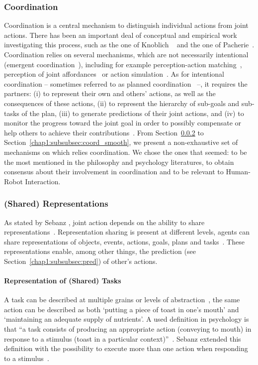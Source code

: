 \documentclass[a4paper,11pt,twoside]{StyleThese}
\begin{document}
\subsubsection{Coordination}
Coordination is a central mechanism to distinguish individual actions from joint actions. There has been an important deal of conceptual and empirical work investigating this process, such as the one of Knoblich \etal~\cite{knoblich_2011_joint} and the one of Pacherie~\cite{pacherie_2012_agency}. Coordination relies on several mechanisms, which are not necessarily intentional (emergent coordination~\cite{knoblich_2011_joint}), including for example perception-action matching~\cite{brass_2001_movement}, perception of joint affordances~\cite{ramenzoni_2008_short} or action simulation~\cite{sebanz_2009_prediction}. As for intentional coordination – sometimes referred to as planned coordination~\cite{knoblich_2011_joint} –, it requires the partners: (i) to represent their own and others' actions, as well as the consequences of these actions, (ii) to represent the hierarchy of sub-goals and sub-tasks of the plan, (iii) to generate predictions of their joint actions, and (iv) to monitor the progress toward the joint goal in order to possibly compensate or help others to achieve their contributions~\cite{pacherie_2012_agency}. From Section~\ref{chap1:subsubsec:shared_rep} to Section~\ref{chap1:subsubsec:coord_smooth}, we present a non-exhaustive set of mechanisms on which relies coordination. We chose the ones that seemed: to be the most mentioned in the philosophy and psychology literatures, to obtain consensus about their involvement in coordination and to be relevant to Human-Robot Interaction. 

\subsubsection{(Shared) Representations}\label{chap1:subsubsec:shared_rep}
As stated by Sebanz \etal, joint action depends on the ability to share representations~\cite{sebanz_2006_joint}. Representation sharing is present at different levels, \ie agents can share representations of objects, events, actions, goals, plans and tasks~\cite{pacherie_2012_agency,vesper_2017_joint}. These representations enable, among other things, the prediction (see Section~\ref{chap1:subsubsec:pred}) of other's actions. 

\paragraph{Representation of (Shared) Tasks}
A task can be described at multiple grains or levels of abstraction~\cite{cooper_2000_contention},  the same action can be described
as both ‘putting a piece of toast in one’s mouth’ and ‘maintaining an adequate supply of nutrients’. A used definition in psychology is that ``a task consists of producing an appropriate action (\eg conveying to mouth) in response to a stimulus (\eg toast in a particular context)''~\cite[p.~1]{monsell_2003_task}. Sebanz \etal{} extended this definition with the possibility to execute more than one action when responding to a stimulus~\cite{sebanz_2005_two}. 
\end{document}
